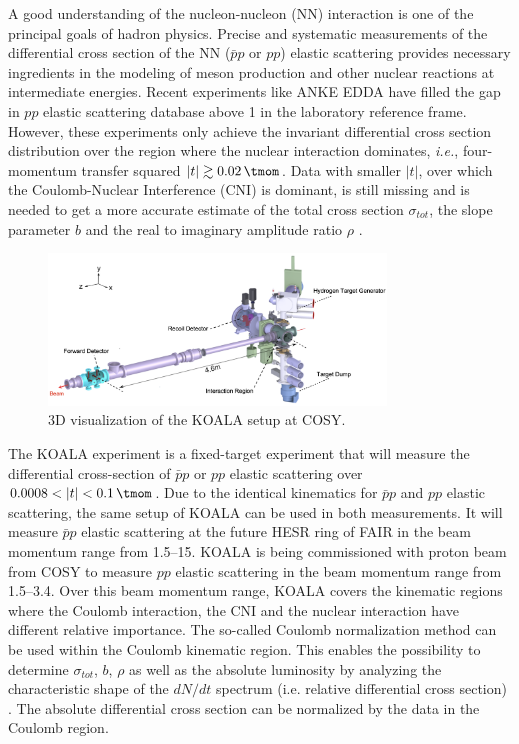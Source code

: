 \documentclass[number,5p]{elsarticle}
\begin{document}
A good understanding of the nucleon-nucleon (NN) interaction is one of the principal goals of hadron physics.
Precise and systematic measurements of the differential cross section of the
NN ($\bar{p}p$ or $pp$) elastic scattering provides necessary ingredients
in the modeling of meson production and other nuclear reactions at intermediate energies.
Recent experiments like ANKE \cite{ANKE} EDDA \cite{EDDA} have filled the gap
in $pp$ elastic scattering database above \SI{1}{\momentum} in the laboratory reference frame.
However, these experiments only achieve the invariant differential cross section distribution over the region where the nuclear interaction dominates, 
\textit{i.e.}, four-momentum transfer squared $|t| \gtrsim \SI{0.02}{\tmom}$.
Data with smaller \(|t|\), over which the Coulomb-Nuclear Interference (CNI) is
dominant, is still missing and is needed to get a more accurate estimate of
the total cross section \({\sigma}_{tot}\), the slope parameter \(b\) and the
real to imaginary amplitude ratio \(\rho\) \cite{RevModPhys.57.563}.

\begin{figure}[htbp]
	\centering
	\includegraphics[width=0.8\textwidth]{./koala_setup.png}
	\caption{3D visualization of the KOALA setup at COSY.}
	\label{fig:setup}
\end{figure}

The KOALA experiment is a fixed-target experiment that will measure the
differential cross-section of $\bar{p}p$ or $pp$ elastic scattering
over $0.0008 < |t| < \SI{0.1}{\tmom}$.
Due to the identical kinematics for $\bar{p}p$ and $pp$ elastic scattering, the
same setup of KOALA can be used in both measurements.
It will measure $\bar{p}p$ elastic
scattering at the future HESR ring of FAIR \cite{FAIR} in the beam momentum range from
\SIrange{1.5}{15}{\momentum}.
KOALA is being commissioned with proton beam from COSY \cite{COSY} to measure $pp$ elastic scattering in the beam momentum range from \SIrange{1.5}{3.4}{\momentum}.
Over this beam momentum range, KOALA covers the kinematic regions where the
Coulomb interaction, the CNI and the nuclear interaction have different relative importance.
The so-called Coulomb normalization method \cite{bernard1987real,jenni2008atlas}
can be used within the Coulomb kinematic region.
This enables the possibility to determine \({\sigma}_{tot}\), \(b\), \(\rho\) as well as
the absolute luminosity by analyzing the characteristic shape of the $dN/dt$
spectrum (i.e. relative differential cross section) \cite{koala_article}.
The absolute differential cross section can be normalized by the data in the
Coulomb region.
\end{document}

